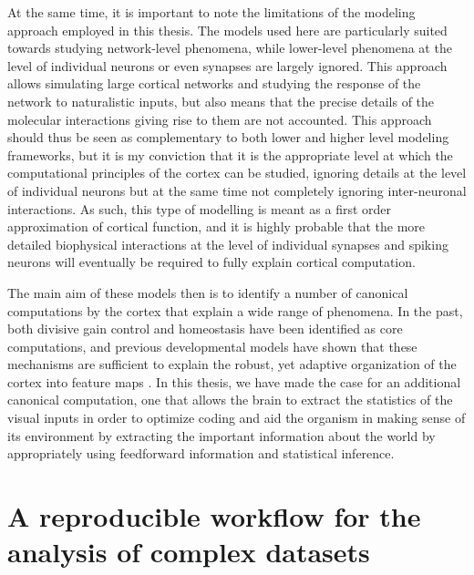 At the same time, it is important to note the limitations of the
modeling approach employed in this thesis. The models used here are
particularly suited towards studying network-level phenomena, while
lower-level phenomena at the level of individual neurons or even
synapses are largely ignored. This approach allows simulating large cortical
networks and studying the response of the network to naturalistic
inputs, but also means that the precise details of the molecular
interactions giving rise to them are not accounted. This approach
should thus be seen as complementary to both lower and higher level
modeling frameworks, but it is my conviction that it is the
appropriate level at which the computational principles of the cortex
can be studied, ignoring details at the level of individual neurons
but at the same time not completely ignoring inter-neuronal
interactions. As such, this type of modelling is meant as a first order approximation of
cortical function, and it is highly probable that the more detailed
biophysical interactions at the level of individual synapses and
spiking neurons will eventually be required to fully explain cortical
computation.

The main aim of these models then is to identify a number of canonical
computations by the cortex that explain a wide range of phenomena. In
the past, both divisive gain control \citep{Carandini2012} and
homeostasis \citep{Marder2006} have been identified as core
computations, and previous developmental models have shown that these
mechanisms are sufficient to explain the robust, yet adaptive
organization of the cortex into feature maps \citep{Stevens2013}. In
this thesis, we have made the case for an additional canonical
computation, one that allows the brain to extract the statistics of the
visual inputs in order to optimize coding and aid the organism in making
sense of its environment by extracting the important information about
the world by appropriately using feedforward information and
statistical inference.

\section{A reproducible workflow for the analysis of complex datasets}

